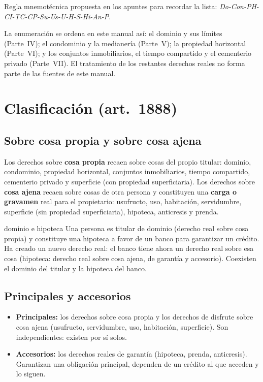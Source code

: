 \documentclass[12pt,oneside]{book}
\begin{document}
\begin{nota}
Regla mnemotécnica propuesta en los apuntes para recordar la lista: \textit{Do-Con-PH-CI-TC-CP-Su-Us-U-H-S-Hi-An-P}.
\end{nota}

La enumeración se ordena en este manual así: el dominio y sus límites (Parte~IV); el condominio y la medianería (Parte~V); la propiedad horizontal (Parte~VI); y los conjuntos inmobiliarios, el tiempo compartido y el cementerio privado (Parte~VII). El tratamiento de los restantes derechos reales no forma parte de las fuentes de este manual.

\section{Clasificación (art.~1888)}

\subsection{Sobre cosa propia y sobre cosa ajena}

Los derechos sobre \textbf{cosa propia} recaen sobre cosas del propio titular: dominio, condominio, propiedad horizontal, conjuntos inmobiliarios, tiempo compartido, cementerio privado y superficie (con propiedad superficiaria). Los derechos sobre \textbf{cosa ajena} recaen sobre cosas de otra persona y constituyen una \textbf{carga o gravamen} real para el propietario: usufructo, uso, habitación, servidumbre, superficie (sin propiedad superficiaria), hipoteca, anticresis y prenda.

\begin{ejemplo}{dominio e hipoteca}
Una persona es titular de dominio (derecho real sobre cosa propia) y constituye una hipoteca a favor de un banco para garantizar un crédito. Ha creado un nuevo derecho real: el banco tiene ahora un derecho real sobre esa cosa (hipoteca: derecho real sobre cosa ajena, de garantía y accesorio). Coexisten el dominio del titular y la hipoteca del banco.
\end{ejemplo}

\subsection{Principales y accesorios}

\begin{itemize}
    \item \textbf{Principales:} los derechos sobre cosa propia y los derechos de disfrute sobre cosa ajena (usufructo, servidumbre, uso, habitación, superficie). Son independientes: existen por sí solos.
    \item \textbf{Accesorios:} los derechos reales de garantía (hipoteca, prenda, anticresis). Garantizan una obligación principal, dependen de un crédito al que acceden y lo siguen.
\end{itemize}
\end{document}
